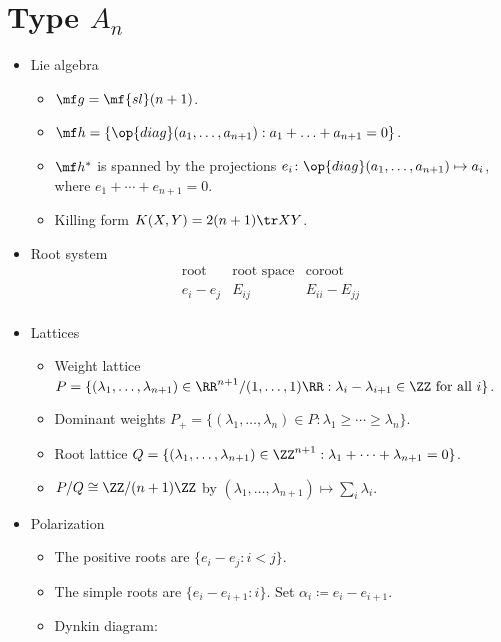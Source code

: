 \documentclass{article}
\begin{document}
\section{Type \texorpdfstring{$A_n$}{ A n}}
\begin{itemize}
	\item Lie algebra
	\begin{itemize}
		\item $\mf g=\mf{sl}(n+1)$.
		\item $\mf h=\{\op{diag}(a_1,\ldots,a_{n+1}):a_1+\ldots+a_{n+1}=0\}$.
		\item $\mf h^*$ is spanned by the projections $e_i\colon\op{diag}(a_1,\ldots,a_{n+1})\mapsto a_i$, where $e_1+\cdots+e_{n+1}=0$.
		\item Killing form $K(X,Y)=2(n+1)\tr XY$.
	\end{itemize}
	\item Root system
	\[\begin{array}{c|cccccc}
		\text{root} & \text{root space} & \text{coroot} \\\hline
		e_i-e_j & E_{ij} & E_{ii}-E_{jj}\\
	\end{array}\]
	\item Lattices
	\begin{itemize}
		\item Weight lattice $P=\{(\lambda_1,\ldots,\lambda_{n+1})\in\RR^{n+1}/(1,\ldots,1)\RR:\lambda_i-\lambda_{i+1}\in\ZZ\text{ for all }i\}$.
		\item Dominant weights $P_+=\{(\lambda_1,\ldots,\lambda_n)\in P:\lambda_1\ge\cdots\ge\lambda_n\}$.
		\item Root lattice $Q=\{(\lambda_1,\ldots,\lambda_{n+1})\in\ZZ^{n+1}:\lambda_1+\cdots+\lambda_{n+1}=0\}$.
		\item $P/Q\cong\ZZ/(n+1)\ZZ$ by $(\lambda_1,\ldots,\lambda_{n+1})\mapsto\sum_i\lambda_i$.
	\end{itemize}
	\item Polarization
	\begin{itemize}
		\item The positive roots are $\{e_i-e_j:i<j\}$.
		\item The simple roots are $\{e_i-e_{i+1}:i\}$. Set $\alpha_i\coloneqq e_i-e_{i+1}$.
		\item Dynkin diagram:

\end{itemize}
\end{itemize}
\end{document}
